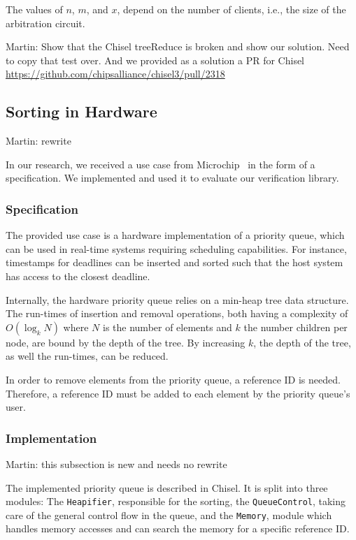 \documentclass[conference]{IEEEtran}
\newcommand{\martin}[1]{{\color{blue} Martin: #1}}
\begin{document}
The values of $n$, $m$, and $x$, depend on the number of clients, i.e., the size of the arbitration
circuit.

\martin{Show that the Chisel treeReduce is broken and show our solution. Need to copy that test
over. And we provided as a solution a PR for Chisel \url{https://github.com/chipsalliance/chisel3/pull/2318}}



\subsection{Sorting in Hardware}

\martin{rewrite}


In our research, we received a use case from Microchip~\cite{microchip} in the form of a specification.
We implemented and used it to evaluate our verification library.

\subsubsection{Specification}

The provided use case is a hardware implementation of a priority queue, which can be used in real-time systems requiring scheduling capabilities. 
For instance, timestamps for deadlines can be inserted and sorted such that the host system has access to the closest deadline.

Internally, the hardware priority queue relies on a min-heap tree data structure. 
The run-times of insertion and removal operations, both having a complexity of $O(\log_k N)$ where $N$ is the number of elements and $k$ the number children per node, are bound by the depth of the tree. 
By increasing $k$, the depth of the tree, as well the run-times, can be reduced.

In order to remove elements from the priority queue, a reference ID is needed. 
Therefore, a reference ID must be added to each element by the priority queue's user.

\subsubsection{Implementation}
\martin{this subsection is new and needs no rewrite}

The implemented priority queue is described in Chisel.
It is split into three modules: The \texttt{Heapifier}, responsible for the sorting, the \texttt{QueueControl}, taking care
of the general control flow in the queue, and the \texttt{Memory}, module which handles memory accesses and can search the memory for a specific reference ID.
\end{document}
